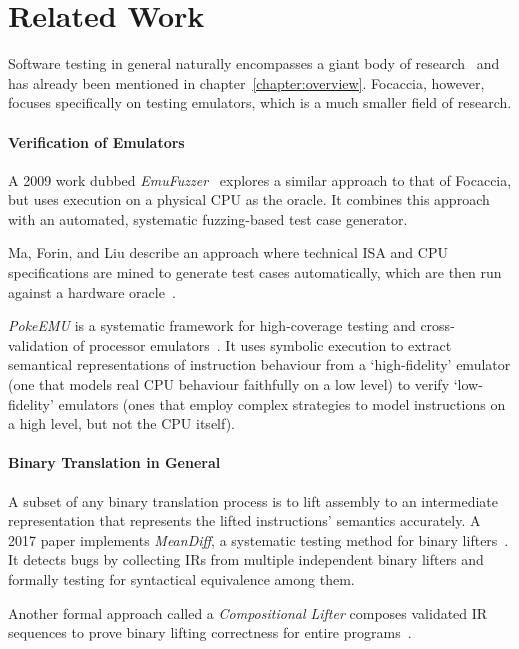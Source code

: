 \chapter{Related Work}

Software testing in general naturally encompasses a giant body of research~\cite{Daka+2014UnitTestingSurvey,
Fraser2019SoftwareTesting, Garousi+2016SoftwareTestingLitRev} and has already been mentioned in
chapter~\ref{chapter:overview}. Focaccia, however, focuses specifically on testing emulators, which is a much smaller
field of research.

\subsubsection{Verification of Emulators}

A 2009 work dubbed \textit{EmuFuzzer}~\cite{Martignoni+2009TestingCpuEmulators} explores a similar approach to that of
Focaccia, but uses execution on a physical CPU as the oracle. It combines this approach with an automated, systematic
fuzzing-based test case generator.

Ma, Forin, and Liu describe an approach where technical \ac{ISA} and CPU specifications are mined to generate test cases
automatically, which are then run against a hardware oracle~\cite{Ma+2010PrototypingAndTestingEmulators}.

\textit{PokeEMU} is a systematic framework for high-coverage testing and cross-validation of processor
emulators~\cite{Martignoni+2012PokeEmu}. It uses symbolic execution to extract semantical representations of instruction
behaviour from a `high-fidelity' emulator (one that models real CPU behaviour faithfully on a low level) to verify
`low-fidelity' emulators (ones that employ complex strategies to model instructions on a high level, but not the CPU
itself).

\subsubsection{Binary Translation in General}

A subset of any binary translation process is to lift assembly to an intermediate representation that represents the
lifted instructions' semantics accurately. A 2017 paper implements \textit{MeanDiff}, a systematic testing method for
binary lifters~\cite{Kim+2017TestBinaryLifters}. It detects bugs by collecting \ac{IR}s from multiple independent binary
lifters and formally testing for syntactical equivalence among them.

Another formal approach called a \textit{Compositional Lifter} composes validated IR sequences to prove binary lifting
correctness for entire programs~\cite{Dasgupta+2020CompLifter}.
